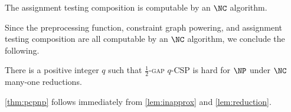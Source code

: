 \begin{lemma}
  The assignment testing composition is computable by an $\NC$ algorithm.
\end{lemma}

Since the preprocessing function, constraint graph powering, and assignment testing composition are all computable by an $\NC$ algorithm, we conclude the following.

\begin{lemma}\label{lem:reduction}
  There is a positive integer $q$ such that \textsc{$\frac{1}{2}$-gap $q$-CSP} is hard for $\NP$ under $\NC$ many-one reductions.
\end{lemma}

\autoref{thm:pcpnp} follows immediately from \autoref{lem:inapprox} and \autoref{lem:reduction}.
